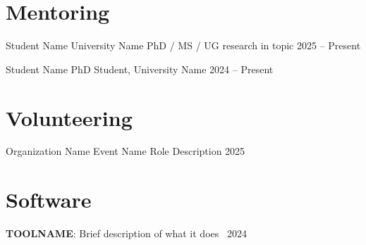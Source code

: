 \documentclass{long-CV}
\begin{document}
\section{Mentoring}

\cvgrant
  {Student Name}
  {University Name}
  {PhD / MS / UG research in topic}
  {}
  {2025 -- Present}

\cvstudent
  {Student Name}
  {PhD Student, University Name}
  {2024 -- Present}

\section{Volunteering}

\cvgrant
  {Organization Name}
  {Event Name}
  {Role Description}
  {}
  {2025}

\section{Software}

\cvsimpleentry
  {\textbf{TOOLNAME}: Brief description of what it does~\href{https://github.com/...}{\small\faExternalLink*}}
  {2024}
\end{document}
